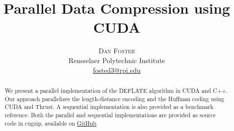 \documentclass[twoside]{article}
\title{\vspace{-15mm}\fontsize{23pt}{10pt}\selectfont\textbf{Parallel Data Compression using CUDA}} %
\author{
\large
\textsc{Dan Foster}\\[2mm] %
\normalsize Rensselaer Polytechnic Institute \\ %
\normalsize \href{mailto:fosted3@rpi.edu}{fosted3@rpi.edu} %
\vspace{-5mm}
}
\date{}
\begin{document}
\maketitle %


\begin{abstract}

\noindent We present a parallel implementation of the DEFLATE algorithm in CUDA and C++. Our approach parallelizes the length-distance encoding and the Huffman coding using CUDA and Thrust. A sequential implementation is also provided as a benchmark reference. Both the parallel and sequential implementations are provided as source code in cugzip, available on \href{https://github.com/fosted3/cugzip/}{GitHub}.

\end{abstract}

\end{document}

